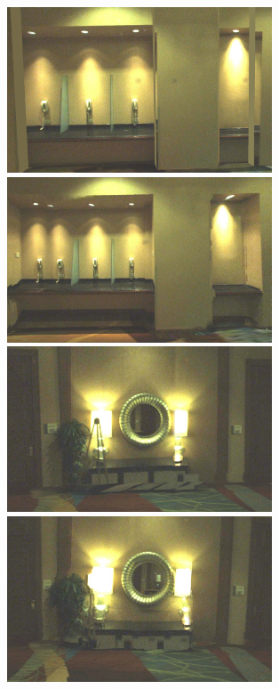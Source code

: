 \documentclass[]{spie}  %
\begin{document}
\begin{figure}
  \centering
  \includegraphics[width=3.1in]{results_houston_1_2d.png}
  \includegraphics[width=3.1in]{results_houston_1_3d.png}\\
  \includegraphics[width=3.1in]{results_houston_2_2d.png}
  \includegraphics[width=3.1in]{results_houston_2_3d.png}\\
\end{figure}
\end{document}
